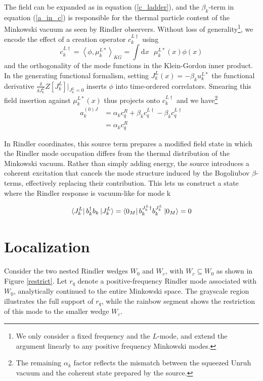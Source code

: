 \documentclass[12pt,a4paper]{article}
\newcommand{\dv}[1]{\mathrm{d} #1 \text{ }}
\begin{document}
The field can be expanded as in equation (\ref{c_ladder}), and the $\beta_k$-term in equation (\ref{a_in_c}) is responsible for the thermal particle content of the Minkowski vacuum as seen by Rindler observers. Without loss of generality\footnote{We only consider a fixed frequency and the $L$-mode, and extend the argument linearly to any positive frequency Minkowski modes.}, we encode the effect of a creation operator $c_k^{L \dagger}$ using
\begin{equation}
  c _k^{L\dagger} = \left<\phi, \mu_k^{L*}\right>_{KG} = \int \dv{x} \mu_k^{L*}(x) \phi(x)
\end{equation}
and the orthogonality of the mode functions in the Klein-Gordon inner product. In the generating functional formalism, setting $J_k^L(x) = -\beta_k u_k^{L*}$ the functional derivative $\frac{\delta}{\delta J_k^L}Z[J_k^L]|_{J_k^L=0}$ inserts $\phi$ into time-ordered correlators. Smearing this field insertion against $\mu_k^{L*}(x)$ thus projects onto $c_k^{L\dagger}$ and we have\footnote{The remaining $\alpha_k$ factor reflects the mismatch between the squeezed Unruh vacuum and the coherent state prepared by the source.}
\begin{equation}
\begin{array}{ll}
  a_k^{(0)J} &= \alpha_k c_q^R + \beta_k c_q^{L\dagger} -  \beta_k c_q^{L\dagger} \\
  &= \alpha_k c_q^R
\end{array}
\end{equation}

In Rindler coordinates, this source term prepares a modified field state in which the Rindler mode occupation differs from the thermal distribution of the Minkowski vacuum. Rather than simply adding energy, the source introduces a coherent excitation that cancels the mode structure induced by the Bogoliubov $\beta$-terms, effectively replacing their contribution. This lets us construct a state where the Rindler response is vacuum-like for mode k

\begin{equation}
  \bra{J_k^L}  b_k^{\dagger} b_k \ket{J_k^L} = \bra{0_M}  b_k^{J_k^L \dagger} b^{J_k^L}_k \ket{0_M} = 0
\end{equation}

\section{Localization}


Consider the two nested Rindler wedges $W_0$ and $W_c$, with $W_c \subseteq W_0$ as shown in Figure \ref{restrict}. Let $r_q$ denote a positive-frequency Rindler mode associated with $W_0$, analytically continued to the entire Minkowski space. The grayscale region illustrates the full support of $r_q$, while the rainbow segment shows the restriction of this mode to the smaller wedge $W_c$.
\end{document}
